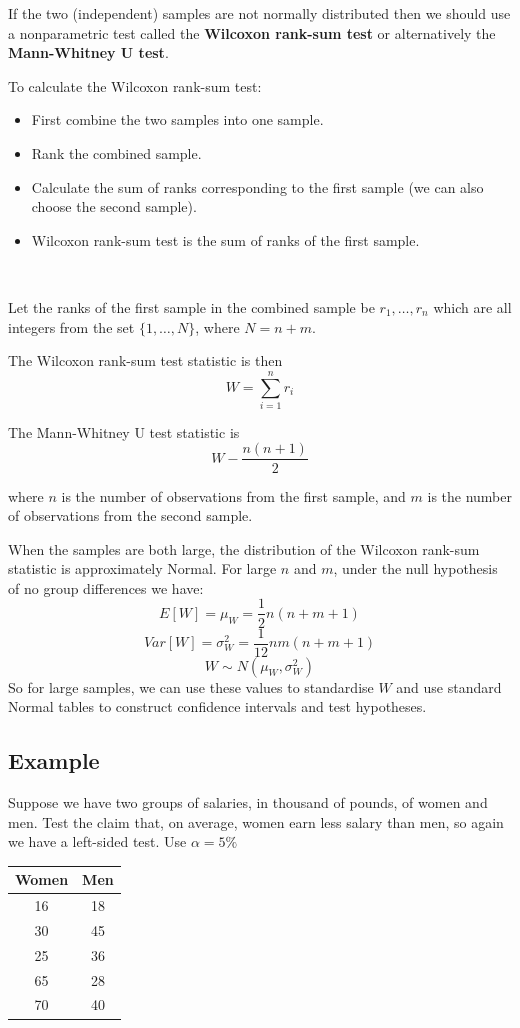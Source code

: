 \documentclass[
]{article}
\begin{document}
If the two (independent) samples are not normally distributed then we
should use a nonparametric test called the \textbf{Wilcoxon rank-sum
test} or alternatively the \textbf{Mann-Whitney U test}.

To calculate the Wilcoxon rank-sum test:

\begin{itemize}
\item
  First combine the two samples into one sample.
\item
  Rank the combined sample.
\item
  Calculate the sum of ranks corresponding to the first sample (we can
  also choose the second sample).
\item
  Wilcoxon rank-sum test is the sum of ranks of the first sample.
\end{itemize}

\(~\)

Let the ranks of the first sample in the combined sample be
\(r_1,\ldots,r_n\) which are all integers from the set
\(\{1,\ldots,N\}\), where \(N=n+m\).

The Wilcoxon rank-sum test statistic is then \[W = \sum_{i=1}^{n} r_i\]

The Mann-Whitney U test statistic is \[W -\frac{n(n+1)}{2}\]

where \(n\) is the number of observations from the first sample, and
\(m\) is the number of observations from the second sample.

When the samples are both large, the distribution of the Wilcoxon
rank-sum statistic is approximately Normal. For large \(n\) and \(m\),
under the null hypothesis of no group differences we have:
\[E[W]=\mu_W=\frac{1}{2} n(n+m+1)\]
\[Var[W]=\sigma^2_W=\frac{1}{12} nm(n+m+1)\]
\[ W\sim N(\mu_W,\sigma^2_W )\] So for large samples, we can use these
values to standardise \(W\) and use standard Normal tables to construct
confidence intervals and test hypotheses.

\hypertarget{example-6}{%
\subsection{Example}\label{example-6}}

Suppose we have two groups of salaries, in thousand of pounds, of women
and men. Test the claim that, on average, women earn less salary than
men, so again we have a left-sided test. Use \(\alpha=5\%\)

\begin{longtable}[]{@{}cc@{}}
\toprule()
Women & Men \\
\midrule()
\endhead
16 & 18 \\
30 & 45 \\
25 & 36 \\
65 & 28 \\
70 & 40 \\
\bottomrule()
\end{longtable}
\end{document}
